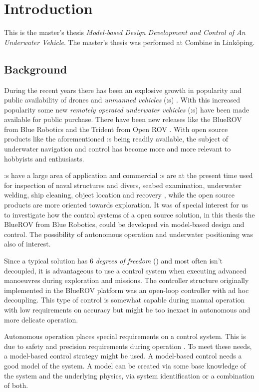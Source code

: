 \chapter{Introduction}\label{cha:intro}
This is the master's thesis \textit{Model-based Design Development and Control of An Underwater Vehicle}.
The master's thesis was performed at Combine in Linköping.

\section{Background}
During the recent years there has been an explosive growth in popularity and public availability of drones and \textit{unmanned vehicles} (\abbrUV:s) \citep{popmechanics}. With this increased popularity some new \textit{remotely operated underwater vehicles} (\abbrROV:s) have been made available for public purchase. There have been new releases like the BlueROV from Blue Robotics \citep{bluerobotics} and the Trident from Open ROV \citep{openrov}. With open source products like the aforementioned \abbrROV:s being readily available, the subject of underwater navigation and control has become more and more relevant to hobbyists and enthusiasts.

\abbrROV:s have a large area of application and commercial \abbrROV:s are at the present time used for inspection of naval structures and divers, seabed examination, underwater welding, ship cleaning, object location and recovery \citep{saab}, while the open source products are more oriented towards exploration. It was of special interest for us to investigate how the control systems of a open source \abbrROV solution, in this thesis the BlueROV from Blue Robotics, could be developed via model-based design and control. The possibility of autonomous operation and underwater positioning was also of interest.

Since a typical \abbrROV solution has 6 \textit{degrees of freedom} (\abbrDOF) and most often isn't decoupled, it is advantageous to use a control system when executing advanced manoeuvres during exploration and missions. The controller structure originally implemented in the BlueROV platform was an open-loop controller with ad hoc decoupling. This type of control is somewhat capable during manual operation with low requirements on accuracy but might be too inexact in autonomous and more delicate operation. 

Autonomous operation places special requirements on a control system. This is due to safety and precision requirements during operation \citep[p.416-417]{safety}. To meet these needs, a model-based control strategy might be used. A model-based control needs a good model of the system. A model can be created via some base knowledge of the system and the underlying physics, via system identification or a combination of both. 

